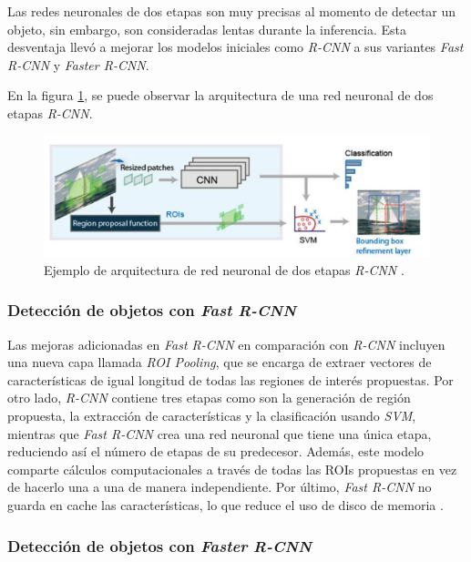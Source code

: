 Las redes neuronales de dos etapas son muy precisas al momento de detectar un objeto, sin embargo, son consideradas lentas durante la inferencia. Esta desventaja llevó a mejorar los modelos iniciales como \textit{R-CNN} a sus variantes \textit{Fast R-CNN} y \textit{Faster R-CNN}.

En la figura \ref{fig:rcnn}, se puede observar la arquitectura de una red neuronal de dos etapas \textit{R-CNN}.

\begin{figure}[ht]
	\centering
	\includegraphics[scale=.25]{./Figures/R-CNN.png}
	\caption{Ejemplo de arquitectura de red neuronal de dos etapas \textit{R-CNN} \cite{WEBSITE:6}.}
	\label{fig:rcnn}
\end{figure}

\subsubsection{Detección de objetos con \textit{Fast R-CNN}}

Las mejoras adicionadas en \textit{Fast R-CNN} en comparación con \textit{R-CNN} incluyen una nueva capa llamada \textit{ROI Pooling}, que se encarga de extraer vectores de características de igual longitud de todas las regiones de interés propuestas. Por otro lado, \textit{R-CNN} contiene tres etapas como son la generación de región propuesta, la extracción de características y la clasificación usando \textit{SVM}, mientras que \textit{Fast R-CNN} crea una red neuronal que tiene una única etapa, reduciendo así el número de etapas de su predecesor. Además, este modelo comparte cálculos computacionales a través de todas las ROIs propuestas en vez de hacerlo una a una de manera independiente. Por último, \textit{Fast R-CNN} no guarda en cache las características, lo que reduce el uso de disco de memoria \cite{ARTICLE:10}.

\subsubsection{Detección de objetos con \textit{Faster R-CNN}}


